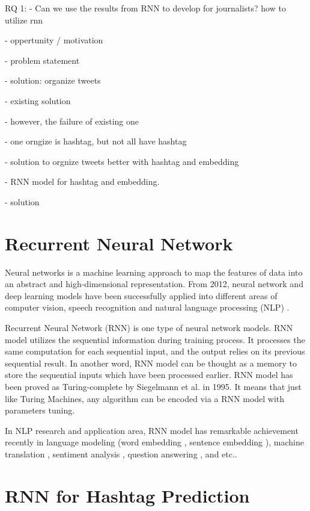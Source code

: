 RQ 1:
- Can we use the results from RNN to develop for journalists? 
how to utilize rnn 


- oppertunity / motivation

- problem statement

- solution: organize tweets

- existing solution

- however, the failure of existing one

- one orngize is hashtag, but not all have hashtag

- solution to orgnize tweets better with hashtag and embedding
 
- RNN model for hashtag and embedding. 

- solution 



\section{Recurrent Neural Network}
Neural networks is a machine learning approach to map the features of data into an abstract and high-dimensional representation. From 2012, neural network and deep learning models have been successfully applied into different areas of computer vision, speech recognition and natural language processing (NLP) \cite{LeCun2015}. 

Recurrent Neural Network (RNN) is one type of neural network models. RNN model utilizes the sequential information during training process. It processes the same computation for each sequential input, and the output relies on its previous sequential result. In another word, RNN model can be thought as a memory to store the sequential inputs which have been processed earlier.  RNN model has been proved as Turing-complete by Siegelmann et al.\cite{Siegelmann1995} in 1995. It means that just like Turing Machines, any algorithm can be encoded via a RNN model with parameters tuning. 

In NLP research and application area, RNN model has remarkable achievement recently in language modeling (word embedding \cite{Mikolov2013}, sentence embedding \cite{Kiros2015}), machine translation \cite{Sutskever2014}, sentiment analysis \cite{Socher2013}, question answering \cite{Iyyer2014}, and etc.. 

\section{RNN for Hashtag Prediction}

